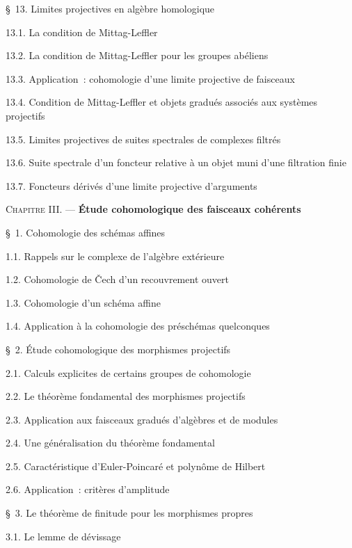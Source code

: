 
\S~13. Limites projectives en algèbre homologique 

13.1. La condition de Mittag-Leffler 

13.2. La condition de Mittag-Leffler pour les groupes abéliens 

13.3. Application~: cohomologie d'une limite projective de faisceaux 

13.4. Condition de Mittag-Leffler et objets gradués associés aux systèmes
projectifs 

13.5. Limites projectives de suites spectrales de complexes filtrés 

13.6. Suite spectrale d'un foncteur relative à un objet muni d'une filtration
finie 

13.7. Foncteurs dérivés d'une limite projective d'arguments 

\medskip
\textsc{Chapitre III.} --- \textbf{Étude cohomologique des faisceaux
cohérents} 

\medskip
\S~1. Cohomologie des schémas affines 

1.1. Rappels sur le complexe de l'algèbre extérieure 

1.2. Cohomologie de Čech d'un recouvrement ouvert 

1.3. Cohomologie d'un schéma affine 

1.4. Application à la cohomologie des préschémas quelconques 

\medskip
\S~2. Étude cohomologique des morphismes projectifs 

2.1. Calculs explicites de certains groupes de cohomologie 

2.2. Le théorème fondamental des morphismes projectifs 

2.3. Application aux faisceaux gradués d'algèbres et de modules 

2.4. Une généralisation du théorème fondamental 

2.5. Caractéristique d'Euler-Poincaré et polynôme de Hilbert 

2.6. Application~: critères d'amplitude 

\medskip
\S~3. Le théorème de finitude pour les morphismes propres 

3.1. Le lemme de dévissage 

